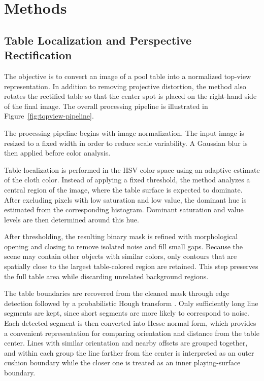 \section{Methods}
\label{sec:methods}

\subsection{Table Localization and Perspective Rectification}

The objective is to convert an image of a pool table into a normalized top-view representation. In addition to removing projective distortion, the method also rotates the rectified table so that the center spot is placed on the right-hand side of the final image. The overall processing pipeline is illustrated in Figure~\ref{fig:topview-pipeline}.

The processing pipeline begins with image normalization. The input image is resized to a fixed width in order to reduce scale variability. A Gaussian blur is then applied before color analysis.

Table localization is performed in the HSV color space using an adaptive estimate of the cloth color. Instead of applying a fixed threshold, the method analyzes a central region of the image, where the table surface is expected to dominate. After excluding pixels with low saturation and low value, the dominant hue is estimated from the corresponding histogram. Dominant saturation and value levels are then determined around this hue.

After thresholding, the resulting binary mask is refined with morphological opening and closing to remove isolated noise and fill small gaps. Because the scene may contain other objects with similar colors, only contours that are spatially close to the largest table-colored region are retained. This step preserves the full table area while discarding unrelated background regions.

The table boundaries are recovered from the cleaned mask through edge detection followed by a probabilistic Hough transform \cite{Canny1986,MATAS2000119}. Only sufficiently long line segments are kept, since short segments are more likely to correspond to noise. Each detected segment is then converted into Hesse normal form, which provides a convenient representation for comparing orientation and distance from the table center. Lines with similar orientation and nearby offsets are grouped together, and within each group the line farther from the center is interpreted as an outer cushion boundary while the closer one is treated as an inner playing-surface boundary.

